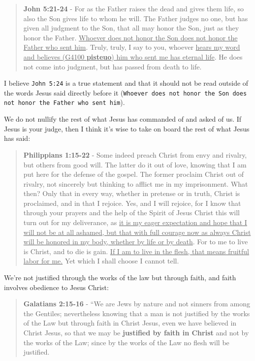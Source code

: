 \documentclass[11pt]{article}
\begin{document}
\begin{quote}
\textbf{John 5:21-24} - For as the Father raises the dead and gives them life, so also the Son gives life to whom he will. The Father judges no one, but has given all judgment to the Son, that all may honor the Son, just as they honor the Father. \uline{Whoever does not honor the Son does not honor the Father who sent him}. Truly, truly, I say to you, whoever \uline{hears my word and believes (G4100 \textbf{pisteuo}) him who sent me has eternal life}. He does not come into judgment, but has passed from death to life.
\end{quote}

I believe \texttt{John 5:24} is a true statement and that it should not be read outside of the words Jesus said directly before it (\texttt{Whoever does not honor the Son does not honor the Father who sent him}).

We do not nullify the rest of what Jesus has commanded of and asked of us. If Jesus is your judge, then I think it's wise to take on board the rest of what Jesus has said:

\begin{quote}
\textbf{Philippians 1:15-22} - Some indeed preach Christ from envy and rivalry, but others from good will. The latter do it out of love, knowing that I am put here for the defense of the gospel. The former proclaim Christ out of rivalry, not sincerely but thinking to afflict me in my imprisonment. What then? Only that in every way, whether in pretense or in truth, Christ is proclaimed, and in that I rejoice. Yes, and I will rejoice, for I know that through your prayers and the help of the Spirit of Jesus Christ this will turn out for my deliverance, as \uline{it is my eager expectation and hope that I will not be at all ashamed, but that with full courage now as always Christ will be honored in my body, whether by life or by death}. For to me to live is Christ, and to die is gain. \uline{If I am to live in the flesh, that means fruitful labor for me.} Yet which I shall choose I cannot tell.
\end{quote}

We're not justified through the works of the law but through faith, and faith involves obedience to Jesus Christ:

\begin{quote}
\textbf{Galatians 2:15-16} - “We are Jews by nature and not sinners from among the Gentiles; nevertheless knowing that a man is not justified by the works of the Law but through faith in Christ Jesus, even we have believed in Christ Jesus, so that we may be \textbf{justified by faith in Christ} and not by the works of the Law; since by the works of the Law no flesh will be justified.
\end{quote}
\end{document}
